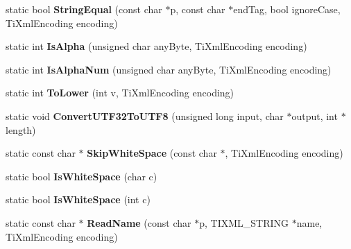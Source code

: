 \begin{DoxyCompactItemize}
\item 
\hypertarget{class_ti_xml_base_a51631e6986179558b9e5850723ed165a}{static bool {\bfseries String\+Equal} (const char $\ast$p, const char $\ast$end\+Tag, bool ignore\+Case, Ti\+Xml\+Encoding encoding)}\label{class_ti_xml_base_a51631e6986179558b9e5850723ed165a}

\item 
\hypertarget{class_ti_xml_base_ae22522b2e8e1ac43102d16394f639fc8}{static int {\bfseries Is\+Alpha} (unsigned char any\+Byte, Ti\+Xml\+Encoding encoding)}\label{class_ti_xml_base_ae22522b2e8e1ac43102d16394f639fc8}

\item 
\hypertarget{class_ti_xml_base_a321919055c115c78ded17f85a793f368}{static int {\bfseries Is\+Alpha\+Num} (unsigned char any\+Byte, Ti\+Xml\+Encoding encoding)}\label{class_ti_xml_base_a321919055c115c78ded17f85a793f368}

\item 
\hypertarget{class_ti_xml_base_a799f17405a86a5c2029618e85f11a097}{static int {\bfseries To\+Lower} (int v, Ti\+Xml\+Encoding encoding)}\label{class_ti_xml_base_a799f17405a86a5c2029618e85f11a097}

\item 
\hypertarget{class_ti_xml_base_a07c765e3a7f979d343e646ea797b180b}{static void {\bfseries Convert\+U\+T\+F32\+To\+U\+T\+F8} (unsigned long input, char $\ast$output, int $\ast$length)}\label{class_ti_xml_base_a07c765e3a7f979d343e646ea797b180b}

\item 
\hypertarget{class_ti_xml_base_a6849556ca97c0a172c6b996f08287ee1}{static const char $\ast$ {\bfseries Skip\+White\+Space} (const char $\ast$, Ti\+Xml\+Encoding encoding)}\label{class_ti_xml_base_a6849556ca97c0a172c6b996f08287ee1}

\item 
\hypertarget{class_ti_xml_base_af56296d561c0bab4bc8e198cdcf5c48e}{static bool {\bfseries Is\+White\+Space} (char c)}\label{class_ti_xml_base_af56296d561c0bab4bc8e198cdcf5c48e}

\item 
\hypertarget{class_ti_xml_base_a3de391ea9f4c4a8aa10d04480b048795}{static bool {\bfseries Is\+White\+Space} (int c)}\label{class_ti_xml_base_a3de391ea9f4c4a8aa10d04480b048795}

\item 
\hypertarget{class_ti_xml_base_a910e1664e0d6a4da5d4d1bfaa51130fe}{static const char $\ast$ {\bfseries Read\+Name} (const char $\ast$p, T\+I\+X\+M\+L\+\_\+\+S\+T\+R\+I\+N\+G $\ast$name, Ti\+Xml\+Encoding encoding)}\label{class_ti_xml_base_a910e1664e0d6a4da5d4d1bfaa51130fe}


\end{DoxyCompactItemize}
